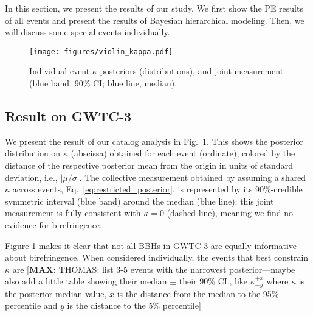 \documentclass[aps,prd,twocolumn,superscriptaddress,preprintnumbers,floatfix,nofootinbib]{revtex4-2}
\newcommand*{\mi}[1]{\textsf{\color{magenta} [\textbf{MAX:} #1]}}
\begin{document}
In this section, we present the results of our study.
We first show the PE results of all events and present the results of Bayesian hierarchical modeling.
Then, we will discuss some special events individually.

\begin{figure}
    \texttt{[image: figures/violin\_kappa.pdf]}
    \caption{
        Individual-event $\kappa$ posteriors (distributions), and joint measurement (blue band, 90\% CI; blue line, median).
    }
    \label{fig:violin_kappa}
\end{figure}

\subsection{Result on GWTC-3}

We present the result of our catalog analysis in Fig.~\ref{fig:violin_kappa}.
This shows the posterior distribution on $\kappa$ (abscissa) obtained for each event (ordinate), colored by the distance of the respective posterior mean from the origin in units of standard deviation, i.e., $|\mu/\sigma|$.
The collective measurement obtained by assuming a shared $\kappa$ across events, Eq.~\eqref{eq:restricted_posterior}, is represented by its 90\%-credible symmetric interval (blue band) around the median (blue line);
this joint measurement is fully consistent with $\kappa = 0$ (dashed line), meaning we find no evidence for birefringence.

Figure \ref{fig:violin_kappa} makes it clear that not all \acp{BBH} in GWTC-3 are equally informative about birefringence.
When considered individually, the events that best constrain $\kappa$ are \mi{THOMAS: list 3-5 events with the narrowest posterior---maybe also add a little table showing their median $\pm$ their 90\% CL, like $\tilde{\kappa}^{+x}_{-y}$ where $\tilde{\kappa}$ is the posterior median value, $x$ is the distance from the median to the 95\% percentile and $y$ is the distance to the 5\% percentile}
\end{document}

